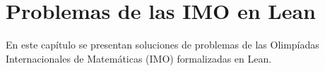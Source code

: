 \chapter{Problemas de las IMO en Lean}

En este capítulo se presentan soluciones de problemas de las Olimpíadas
Internacionales de Matemáticas (IMO) formalizadas en Lean.
